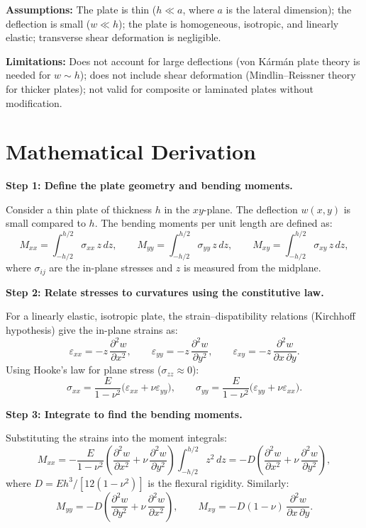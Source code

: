 \textbf{Assumptions:} The plate is thin ($h \ll a$, where $a$ is the lateral dimension); the deflection is small ($w \ll h$); the plate is homogeneous, isotropic, and linearly elastic; transverse shear deformation is negligible.


\textbf{Limitations:} Does not account for large deflections (von Kármán plate theory is needed for $w \sim h$); does not include shear deformation (Mindlin--Reissner theory for thicker plates); not valid for composite or laminated plates without modification.


\section*{Mathematical Derivation}

\textbf{Step 1: Define the plate geometry and bending moments.}

Consider a thin plate of thickness $h$ in the $xy$-plane. The deflection $w(x,y)$ is small compared to $h$. The bending moments per unit length are defined as:
\begin{equation}
M_{xx} = \int_{-h/2}^{h/2} \sigma_{xx}\,z\,dz, \qquad M_{yy} = \int_{-h/2}^{h/2} \sigma_{yy}\,z\,dz, \qquad M_{xy} = \int_{-h/2}^{h/2} \sigma_{xy}\,z\,dz,
\end{equation}
where $\sigma_{ij}$ are the in-plane stresses and $z$ is measured from the midplane.

\textbf{Step 2: Relate stresses to curvatures using the constitutive law.}

For a linearly elastic, isotropic plate, the strain--dispatibility relations (Kirchhoff hypothesis) give the in-plane strains as:
\begin{equation}
\varepsilon_{xx} = -z\,\frac{\partial^{2}w}{\partial x^{2}}, \qquad \varepsilon_{yy} = -z\,\frac{\partial^{2}w}{\partial y^{2}}, \qquad \varepsilon_{xy} = -z\,\frac{\partial^{2}w}{\partial x\,\partial y}.
\end{equation}
Using Hooke's law for plane stress ($\sigma_{zz} \approx 0$):
\begin{equation}
\sigma_{xx} = \frac{E}{1-\nu^{2}}\bigl(\varepsilon_{xx} + \nu\varepsilon_{yy}\bigr), \qquad \sigma_{yy} = \frac{E}{1-\nu^{2}}\bigl(\varepsilon_{yy} + \nu\varepsilon_{xx}\bigr).
\end{equation}

\textbf{Step 3: Integrate to find the bending moments.}

Substituting the strains into the moment integrals:
\begin{equation}
M_{xx} = -\frac{E}{1-\nu^{2}}\!\left(\frac{\partial^{2}w}{\partial x^{2}} + \nu\,\frac{\partial^{2}w}{\partial y^{2}}\right)\!\int_{-h/2}^{h/2} z^{2}\,dz = -D\!\left(\frac{\partial^{2}w}{\partial x^{2}} + \nu\,\frac{\partial^{2}w}{\partial y^{2}}\right),
\end{equation}
where $D = Eh^{3}/[12(1-\nu^{2})]$ is the flexural rigidity. Similarly:
\begin{equation}
M_{yy} = -D\!\left(\frac{\partial^{2}w}{\partial y^{2}} + \nu\,\frac{\partial^{2}w}{\partial x^{2}}\right), \qquad M_{xy} = -D(1-\nu)\,\frac{\partial^{2}w}{\partial x\,\partial y}.
\end{equation}

